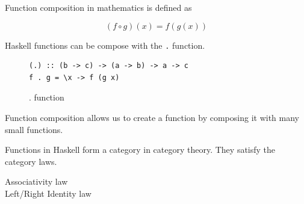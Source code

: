 \documentclass[twoside, a4paper, 12pt]{article}
\begin{document}
\label{sec:functioncomposition}

Function composition in mathematics is defined as

\begin{equation}
  \label{eq:functioncomposition}
  (f \circ g)(x) = f(g(x))
\end{equation}

Haskell functions can be compose with the \verb|.| function.

\begin{figure}
  \centering
\begin{verbatim}
(.) :: (b -> c) -> (a -> b) -> a -> c
f . g = \x -> f (g x)
\end{verbatim}
  \caption{. function}
  \label{fig:compositionfunction}
\end{figure}

Function composition allows us to create a function by composing it with many small functions. 

Functions in Haskell form a category in category theory. They satisfy the category laws.
\begin{description}
\item[Associativity law] 
\item[Left/Right Identity law] 
\end{description}



\end{document}
